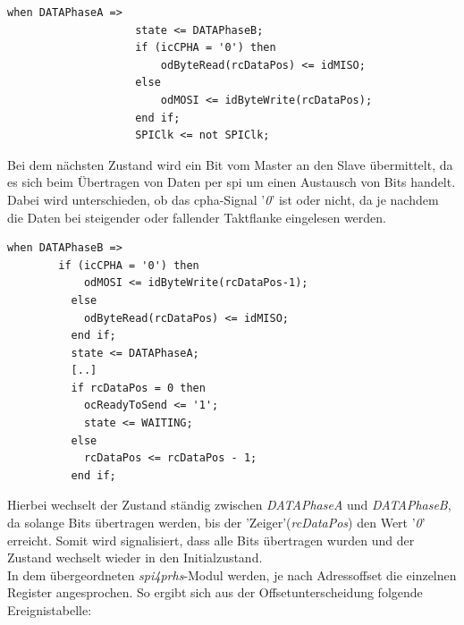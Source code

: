 \begin{lstlisting}[caption={Byteübertragung des Masters in der \ac{spi}-Master RSM},label={code:byteübertragungmaster}]
      when DATAPhaseA =>
  	                state <= DATAPhaseB;
  	                if (icCPHA = '0') then
  	                	odByteRead(rcDataPos) <= idMISO;
  	                else
  	                	odMOSI <= idByteWrite(rcDataPos);
  	                end if;
  	                SPIClk <= not SPIClk;
     \end{lstlisting}
Bei dem nächsten Zustand wird ein Bit vom Master an den Slave übermittelt, da es sich beim Übertragen von Daten
per \ac{spi} um einen Austausch von Bits handelt.\\
 Dabei wird unterschieden, ob das \ac{cpha}-Signal '\emph{0}' ist oder nicht, da je nachdem
die Daten bei steigender oder fallender Taktflanke eingelesen werden. \\

\begin{lstlisting}[caption={Datenübertragung des Slaves in der \ac{spi}-Master RSM},label={code:datenübertragungmaster}]
  when DATAPhaseB =>
        if (icCPHA = '0') then
            odMOSI <= idByteWrite(rcDataPos-1);
          else
            odByteRead(rcDataPos) <= idMISO;
          end if;
          state <= DATAPhaseA;
          [..]
          if rcDataPos = 0 then
            ocReadyToSend <= '1';
            state <= WAITING;
          else
            rcDataPos <= rcDataPos - 1;
          end if;

 \end{lstlisting}

Hierbei wechselt der Zustand ständig zwischen \emph{DATAPhaseA} und \emph{DATAPhaseB}, da solange Bits übertragen werden,
bis der 'Zeiger'(\emph{rcDataPos}) den Wert '\emph{0}' erreicht. Somit wird signalisiert, dass alle Bits übertragen wurden
und der Zustand wechselt wieder in den Initialzustand. \\

In dem übergeordneten \emph{spi4prhs}-Modul werden, je nach Adressoffset die einzelnen Register angesprochen.
So ergibt sich aus der Offsetunterscheidung folgende Ereignistabelle:\\

